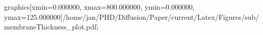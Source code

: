 graphics[xmin=0.000000, xmax=800.000000, ymin=0.000000, ymax=125.000000]{/home/jan/PHD/Diffusion/Paper/current/Latex/Figures/sub/membraneThickness_plot.pdf}; 
